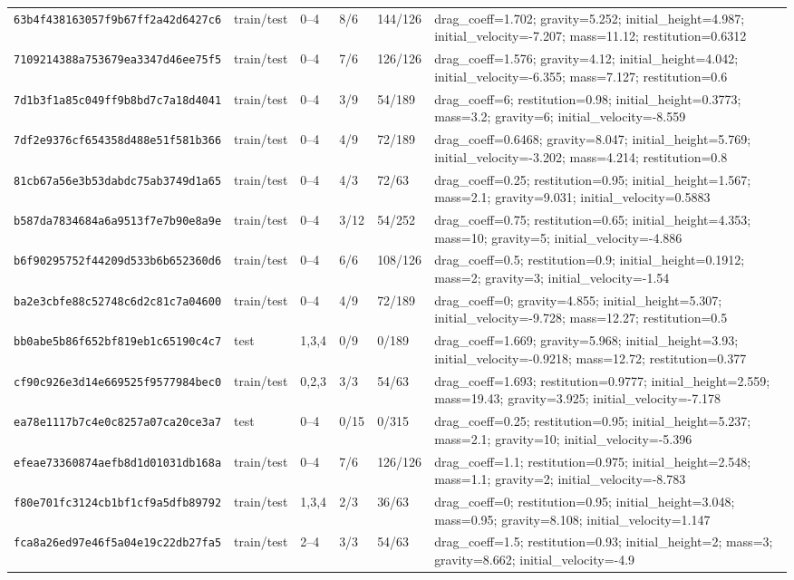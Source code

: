 \begin{tabular*}{\textwidth}{@{\extracolsep{\fill}}llllll@{}}
\texttt{63b4f438163057f9b67ff2a42d6427c6} & train/test & 0--4 & 8/6 & 144/126 & drag\_coeff=1.702; gravity=5.252; initial\_height=4.987; initial\_velocity=-7.207; mass=11.12; restitution=0.6312 \\
\texttt{7109214388a753679ea3347d46ee75f5} & train/test & 0--4 & 7/6 & 126/126 & drag\_coeff=1.576; gravity=4.12; initial\_height=4.042; initial\_velocity=-6.355; mass=7.127; restitution=0.6 \\
\texttt{7d1b3f1a85c049ff9b8bd7c7a18d4041} & train/test & 0--4 & 3/9 & 54/189 & drag\_coeff=6; restitution=0.98; initial\_height=0.3773; mass=3.2; gravity=6; initial\_velocity=-8.559 \\
\texttt{7df2e9376cf654358d488e51f581b366} & train/test & 0--4 & 4/9 & 72/189 & drag\_coeff=0.6468; gravity=8.047; initial\_height=5.769; initial\_velocity=-3.202; mass=4.214; restitution=0.8 \\
\texttt{81cb67a56e3b53dabdc75ab3749d1a65} & train/test & 0--4 & 4/3 & 72/63 & drag\_coeff=0.25; restitution=0.95; initial\_height=1.567; mass=2.1; gravity=9.031; initial\_velocity=0.5883 \\
\texttt{b587da7834684a6a9513f7e7b90e8a9e} & train/test & 0--4 & 3/12 & 54/252 & drag\_coeff=0.75; restitution=0.65; initial\_height=4.353; mass=10; gravity=5; initial\_velocity=-4.886 \\
\texttt{b6f90295752f44209d533b6b652360d6} & train/test & 0--4 & 6/6 & 108/126 & drag\_coeff=0.5; restitution=0.9; initial\_height=0.1912; mass=2; gravity=3; initial\_velocity=-1.54 \\
\texttt{ba2e3cbfe88c52748c6d2c81c7a04600} & train/test & 0--4 & 4/9 & 72/189 & drag\_coeff=0; gravity=4.855; initial\_height=5.307; initial\_velocity=-9.728; mass=12.27; restitution=0.5 \\
\texttt{bb0abe5b86f652bf819eb1c65190c4c7} & test & 1,3,4 & 0/9 & 0/189 & drag\_coeff=1.669; gravity=5.968; initial\_height=3.93; initial\_velocity=-0.9218; mass=12.72; restitution=0.377 \\
\texttt{cf90c926e3d14e669525f9577984bec0} & train/test & 0,2,3 & 3/3 & 54/63 & drag\_coeff=1.693; restitution=0.9777; initial\_height=2.559; mass=19.43; gravity=3.925; initial\_velocity=-7.178 \\
\texttt{ea78e1117b7c4e0c8257a07ca20ce3a7} & test & 0--4 & 0/15 & 0/315 & drag\_coeff=0.25; restitution=0.95; initial\_height=5.237; mass=2.1; gravity=10; initial\_velocity=-5.396 \\
\texttt{efeae73360874aefb8d1d01031db168a} & train/test & 0--4 & 7/6 & 126/126 & drag\_coeff=1.1; restitution=0.975; initial\_height=2.548; mass=1.1; gravity=2; initial\_velocity=-8.783 \\
\texttt{f80e701fc3124cb1bf1cf9a5dfb89792} & train/test & 1,3,4 & 2/3 & 36/63 & drag\_coeff=0; restitution=0.95; initial\_height=3.048; mass=0.95; gravity=8.108; initial\_velocity=1.147 \\
\texttt{fca8a26ed97e46f5a04e19c22db27fa5} & train/test & 2--4 & 3/3 & 54/63 & drag\_coeff=1.5; restitution=0.93; initial\_height=2; mass=3; gravity=8.662; initial\_velocity=-4.9 \\
\bottomrule
\end{tabular*}
\endgroup
